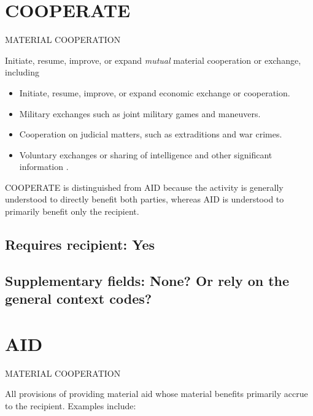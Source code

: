 \documentclass[11pt]{report}
\newcommand{\plcat}[1]{\textsf{#1}}
\newcommand{\ti}[1]{\textit{#1}}
\begin{document}
\bigskip

\section{COOPERATE}

\textsf{MATERIAL COOPERATION} \vspace{8pt}


Initiate, resume, improve, or expand \ti{mutual} material cooperation or exchange, including

\begin{itemize}
\item Initiate, resume, improve, or expand economic exchange or cooperation.

\item Military exchanges such as joint military games and maneuvers.

\item Cooperation on judicial matters, such as extraditions and war crimes.

\item Voluntary exchanges or sharing of intelligence and other significant information .

\end{itemize}

\noindent \plcat{COOPERATE} is distinguished from \plcat{AID} because the activity is generally understood to directly benefit both parties, whereas  \plcat{AID} is understood to primarily benefit only the recipient. 

\subsection{Requires recipient: Yes}

\subsection{Supplementary fields: None? Or rely on the general context codes?}


\newpage

\section{AID}

\textsf{MATERIAL COOPERATION} \vspace{8pt}

All provisions of providing material aid whose material benefits primarily accrue to the recipient. Examples include: 
\end{document}
